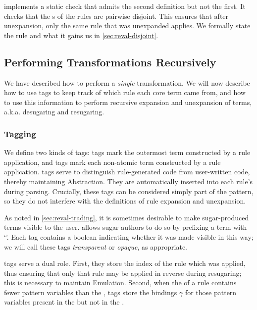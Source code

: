 {\Resugarer} implements a static check that admits the second definition
but not the first. It checks that the s of the rules are pairwise
disjoint. This
ensures that after unexpansion, only the same rule that was unexpanded
applies. We formally state the rule and what it gains us in
\cref{sec:reval-disjoint}.

\subsection{Performing Transformations Recursively}
\label{sec:reval-manyrule}

We have described how to perform a \emph{single} transformation. We will now
describe how to use tags to keep track of which rule each core term came
from, and how to use this information to perform recursive expansion and
unexpansion of terms, a.k.a. desugaring and resugaring.

\subsubsection{Tagging}
\label{sec:reval-tagging}

We define two kinds of tags: {\MacHeadf} tags mark the outermost term
constructed by a rule application, and {\MacBodyf} tags mark each
non-atomic term constructed by a rule application. {\MacBodyf} tags serve
to distinguish rule-generated code from user-written code, thereby
maintaining Abstraction. They are automatically inserted into each rule's
 during parsing. Crucially, these tags can be considered simply part
of the  pattern, so they do not interfere with the definitions of
rule expansion and unexpansion. 

As noted in
\cref{sec:reval-trading}, it is sometimes desirable to make sugar-produced
terms visible to the user. {\Resugarer} allows sugar authors to do so by
prefixing a term with `\Code{!}'. Each {\MacBodyf} tag contains a boolean
indicating whether it was made visible in this way; we will call these tags
\emph{transparent} or \emph{opaque}, as appropriate.

{\MacHeadf} tags serve a dual role. First, they store the index of the
rule which was applied, thus ensuring that only that rule may be applied
in reverse during resugaring; this is necessary to maintain
Emulation. Second, when the  of a rule contains fewer pattern variables than
the , {\MacHeadf} tags store the bindings $\gamma$ for those
pattern variables present in the  but not in the .

